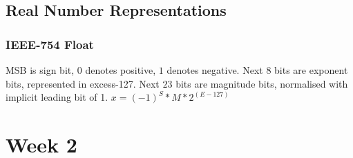 \documentclass{article}
\begin{document}
\begin{multicols*}{3}
\subsection{Real Number Representations}
\subsubsection{IEEE-754 Float}
MSB is sign bit, $0$ denotes positive, $1$ denotes negative.
Next $8$ bits are exponent bits, represented in excess-127.
Next $23$ bits are magnitude bits, normalised with implicit leading bit of 1.
$x = (-1)^{S}*M*2^{(E-127)}$
\section{Week 2}
\end{multicols*}
\end{document}
